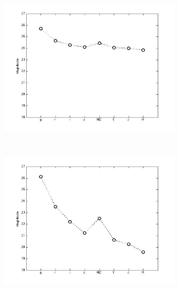 \documentclass[useAMS,usenatbib,fleqn]{mn2e}
\begin{document}
\begin{figure}
\begin{subfigure}[b]{0.075\textwidth}
                \includegraphics[trim = 35px 15px 50px 25px, clip=true,width=\textwidth]{figures/basis_07.jpg}
        \end{subfigure}
        ~
        \begin{subfigure}[b]{0.075\textwidth}
                \includegraphics[trim = 35px 15px 50px 25px, clip=true,width=\textwidth]{figures/basis_08.jpg}
        \end{subfigure}
        ~
        \begin{subfigure}[b]{0.075\textwidth}

\end{subfigure}
\end{figure}
\end{document}
